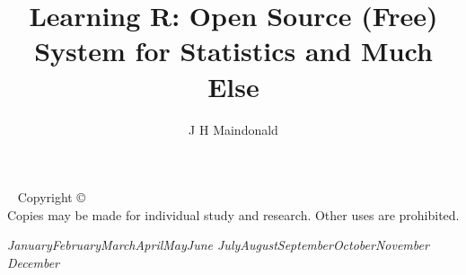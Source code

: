 \documentclass{tufte-book}\usepackage[]{graphicx}\usepackage[]{color}
\title{Learning R: Open Source (Free) System for Statistics and Much Else}
\author[]{J H Maindonald}
\newcommand{\monthyear}{%
  \ifcase\month\or January\or February\or March\or April\or May\or June\or
  July\or August\or September\or October\or November\or
  December\fi\space\number\year
}
\newcommand{\blankpage}{\newpage\hbox{}\thispagestyle{empty}\newpage}
\begin{document}
\frontmatter




%

\setsidenotefont{\small}
\setcaptionfont{\small}
\setmarginnotefont{\small}

\BgThispage
\bmdefine{}
\bmdefine{}
\bmdefine{}


\maketitle

\newpage
\begin{fullwidth}
~\vfill
\thispagestyle{empty}
\setlength{\parindent}{0pt}
\setlength{\parskip}{\baselineskip}
Copyright \copyright\ \the\year\ \thanklessauthor\\
Copies may be made for individual study and research.  Other uses
are prohibited.



\par\textit{\monthyear}
\end{fullwidth}
\vfill
\end{document}
